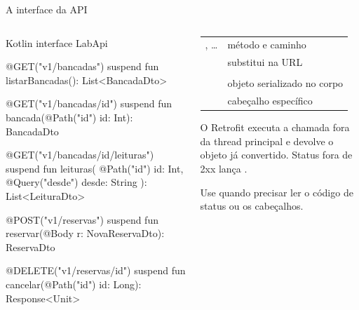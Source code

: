 \documentclass[aspectratio=169,10pt]{beamer}
\begin{document}
\begin{frame}[fragile]{A interface da API}
  \begin{columns}[T]
    \begin{column}{0.54\textwidth}
\begin{codigo}[title=LabApi.kt]{Kotlin}
interface LabApi {
  @GET("v1/bancadas")
  suspend fun listarBancadas(): List<BancadaDto>

  @GET("v1/bancadas/{id}")
  suspend fun bancada(@Path("id") id: Int): BancadaDto

  @GET("v1/bancadas/{id}/leituras")
  suspend fun leituras(
    @Path("id") id: Int,
    @Query("desde") desde: String
  ): List<LeituraDto>

  @POST("v1/reservas")
  suspend fun reservar(@Body r: NovaReservaDto): ReservaDto

  @DELETE("v1/reservas/{id}")
  suspend fun cancelar(@Path("id") id: Long): Response<Unit>
}
\end{codigo}
    \end{column}
    \begin{column}{0.44\textwidth}
      \scriptsize
      \begin{tabularx}{\linewidth}{@{}l L@{}}
        \toprule
         &  \\
        \midrule
        , \ldots & método e caminho \\
         & substitui  na URL \\
         &  \\
         & objeto serializado no corpo \\
         & cabeçalho específico \\
        \bottomrule
      \end{tabularx}
      \begin{conceito}
        O Retrofit executa a chamada fora da thread principal e devolve o objeto já convertido. Status fora de 2xx lança .
      \end{conceito}
      \begin{dica}
        Use  quando precisar ler o código de status ou os cabeçalhos.
      \end{dica}
    \end{column}
  \end{columns}
\end{frame}
\end{document}
